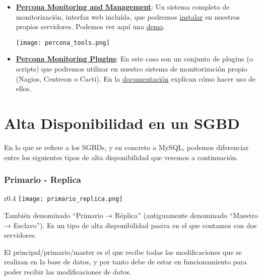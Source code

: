 \begin{itemize}
    \item \href{https://www.percona.com/software/database-tools/percona-monitoring-and-management}{\textbf{Percona Monitoring and Management}}: Un sistema completo de monitorización, interfaz web incluída, que podremos \href{https://www.percona.com/software/pmm/quickstart}{instalar} en nuestros propios servidores. Podemos ver aquí una \href{https://pmmdemo.percona.com/graph/}{demo}.

    \texttt{[image: percona\_tools.png]}

    \item \href{https://www.percona.com/software/database-tools/percona-monitoring-plugins}{\textbf{Percona Monitoring Plugins}}: En este caso son un conjunto de plugins (o scripts) que podremos utilizar en nuestro sistema de monitorización propio (Nagios, Centreon o Cacti). En la \href{https://www.percona.com/doc/percona-monitoring-plugins/LATEST/index.html}{documentación} explican cómo hacer uso de ellos.
\end{itemize}



\chapter{Alta Disponibilidad en un SGBD}




En lo que se refiere a los SGBDs, y en concreto a MySQL, podemos diferenciar entre los siguientes tipos de alta disponibilidad que veremos a continuación.


\subsection{Primario - Replica}
\begin{wrapfigure}{r}{0.4\linewidth}
    \centering
    \vspace{-50pt}
    \texttt{[image: primario\_replica.png]}
    \vspace{-30pt}
\end{wrapfigure}
También denominado “Primario → Réplica” (antiguamente denominado “Maestro → Esclavo”). Es un tipo de alta disponibilidad pasiva en el que contamos con dos servidores.

El principal/primario/master es el que recibe todas las modificaciones que se realizan en la base de datos, y por tanto debe de estar en funcionamiento para poder recibir las modificaciones de datos.

